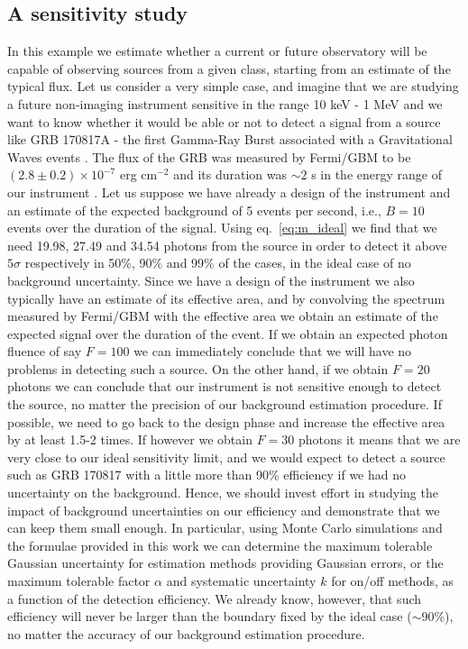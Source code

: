 \documentclass[twocolumn]{aastex61}
\renewcommand{\textbf}{}
\begin{document}
\subsection{A sensitivity study}
\label{sec:example_ideal}
\textbf{In this example we estimate whether a current or future observatory will be capable of observing sources from a given class, starting from an estimate of the typical flux. Let us consider a very simple case, and imagine that we are studying a future non-imaging instrument sensitive in the range 10 keV - 1 MeV and we want to know whether it would be able or not to detect a signal from a source like GRB 170817A - the first Gamma-Ray Burst associated with a Gravitational Waves events \citep{Abbott2017}. The flux of the GRB was measured by Fermi/GBM to be $(2.8 \pm 0.2) \times 10^{-7}$ erg cm$^{-2}$ and its duration was $\sim 2$ s in the energy range of our instrument \citep{Goldstein2017}. Let us suppose we have already a design of the instrument and an estimate of the expected background of 5 events per second, i.e., $B=10$ events over the duration of the signal. Using eq.~\ref{eq:m_ideal} we find that we need 19.98, 27.49 and 34.54 photons from the source in order to detect it above $5\sigma$ respectively in 50\%, 90\% and 99\% of the cases, in the ideal case of no background uncertainty. Since we have a design of the instrument we also typically have an estimate of its effective area, and by convolving the spectrum measured by Fermi/GBM with the effective area we obtain an estimate of the expected signal over the duration of the event. If we obtain an expected photon fluence of say $F=100$ we can immediately conclude that we will have no problems in detecting such a source. On the other hand, if we obtain $F=20$ photons we can conclude that our instrument is not sensitive enough to detect the source, no matter the precision of our background estimation procedure. If possible, we need to go back to the design phase and increase the effective area by at least 1.5-2 times. If however we obtain $F=30$ photons it means that we are very close to our ideal sensitivity limit, and we would expect to detect a source such as GRB 170817 with a little more than 90\% efficiency if we had no uncertainty on the background. Hence, we should invest effort in studying the impact of background uncertainties on our efficiency and demonstrate that we can keep them small enough. In particular, using Monte Carlo simulations and the formulae provided in this work we can determine the maximum tolerable Gaussian uncertainty for estimation methods providing Gaussian errors, or the maximum tolerable factor $\alpha$ and systematic uncertainty $k$ for on/off methods, as a function of the detection efficiency. We already know, however, that such efficiency will never be larger than the boundary fixed by the ideal case ($\sim 90$\%), no matter the accuracy of our background estimation procedure.}
\end{document}
